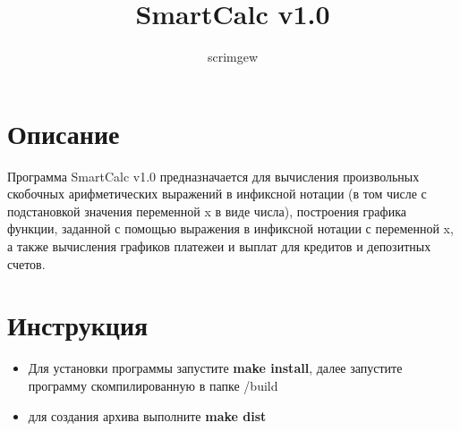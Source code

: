 \documentclass{article}
\title{SmartCalc v1.0}
\author{scrimgew}
\begin{document}
\maketitle
\section{Описание}
Программа SmartCalc v1.0 предназначается для вычисления произвольных скобочных арифметических выражений в инфиксной нотации (в том числе с подстановкой значения переменной x в виде числа), построения графика функции, заданной с помощью выражения в инфиксной нотации с переменной x, а также вычисления графиков платежеи и выплат для кредитов и депозитных счетов.

\section{Инструкция}
\begin{itemize}
\item Для установки программы запустите \textbf{make install}, далее запустите программу скомпилированную в папке /build
\item для создания архива выполните \textbf{make dist}
\end{itemize}
\end{document}
